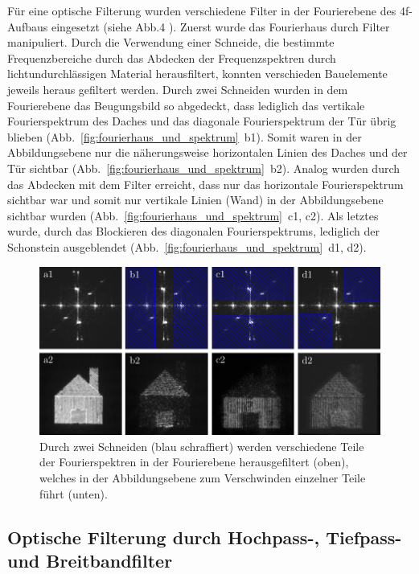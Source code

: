 Für eine optische Filterung wurden verschiedene Filter in der Fourierebene des 4f-Aufbaus eingesetzt (siehe Abb.4%
). Zuerst wurde das Fourierhaus durch Filter manipuliert. Durch die Verwendung einer Schneide, die bestimmte Frequenzbereiche durch das Abdecken der Frequenzspektren durch lichtundurchlässigen Material herausfiltert, konnten verschieden Bauelemente jeweils heraus gefiltert werden. Durch zwei Schneiden wurden in dem Fourierebene das Beugungsbild so abgedeckt, dass lediglich das vertikale Fourierspektrum des Daches und das diagonale Fourierspektrum der Tür übrig blieben (Abb.~\ref{fig:fourierhaus_und_spektrum}~b1). Somit waren in der Abbildungsebene nur die näherungsweise horizontalen Linien des Daches und der Tür sichtbar (Abb.~\ref{fig:fourierhaus_und_spektrum}~b2). Analog wurden durch das Abdecken mit dem Filter erreicht, dass nur das horizontale Fourierspektrum sichtbar war und somit nur vertikale Linien (Wand) in der Abbildungsebene sichtbar wurden (Abb.~\ref{fig:fourierhaus_und_spektrum}~c1, c2). Als letztes wurde, durch das Blockieren des diagonalen Fourierspektrums, lediglich der Schonstein ausgeblendet (Abb.~\ref{fig:fourierhaus_und_spektrum}~d1, d2).

\begin{figure}[h]
	\centering
	\includegraphics[scale=1]{images/Regina/abb21.pdf}
	
	\caption[Fourierhaus mit verschiedenen Filtern]{
		Durch zwei Schneiden (blau schraffiert) werden verschiedene Teile der Fourierspektren in der Fourierebene herausgefiltert (oben), welches in der Abbildungsebene zum Verschwinden einzelner Teile führt (unten).
	}
	\label{fig:fourierhaus_mit_filtern}
\end{figure}

\subsection{Optische Filterung durch Hochpass-, Tiefpass- und Breitbandfilter}

